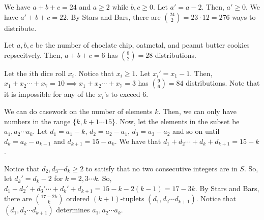 \documentclass[11pt]{article}
\begin{document}

\begin{sol}
We have $a+b+c=24$ and $a\ge 2$ while $b,c\ge 0$. Let $a'=a-2$. Then, $a'\ge 0$. We have $a'+b+c=22$. By Stars and Bars, there are $\binom{24}{2}=23\cdot 12=\boxed{276}$ ways to distribute.
\end{sol}


\begin{sol} 
Let $a,b,c$ be the number of choclate chip, oatmetal, and peanut butter cookies repsecitvely. Then, $a+b+c=6$ has $\binom{8}{2}=\boxed{28}$ distributions.
\end{sol}


\begin{sol} 
Let the $i$th dice roll $x_{i}$. Notice that $x_{i}\ge 1$. Let $x_{i}'=x_{1}-1$. Then, $x_{1}+x_{2}\cdots + x_{7}=10\implies x_{1}+x_{2}\cdots + x_{7}=3$ has $\binom{9}{6}=\boxed{84}$ distributions. Note that it is impossible for any of the $x_{i}$'s to exceed $6$.
\end{sol}


\begin{sol} 
We can do casework on the number of elements $k$. Then, we can only have numbers in the range $\{k,k+1\cdots 15\}$. Now, let the elements in the subset be $a_{1},a_{2}\cdots a_{k}$. Let $d_{1}=a_{1}-k$, $d_{2}=a_{2}-a_{1}$, $d_{3}=a_{3}-a_{2}$ and so on until $d_{k}=a_{k}-a_{k-1}$ and $d_{k+1}=15-a_{k}$. We have that $d_{1}+d_{2}\cdots + d_{k}+d_{k+1}=15-k$. 

Notice that $d_{2},d_{3}\cdots d_{k}\ge 2$ to satisfy that no two consecutive integers are in $S$. So, let $d_{k}'=d_{k}-2$ for $k=2,3\cdots k$. So, $d_{1}+d_{2}'+d_{3}'\cdots +d_{k}'+d_{k+1}=15-k-2(k-1)=17-3k$. By Stars and Bars, there are $\binom{17-2k}{k}$ ordered $(k+1)$-tuplets $(d_{1},d_{2}\cdots d_{k+1})$. Notice that $(d_{1},d_{2}\cdots d_{k+1})$ determines $a_{1},a_{2}\cdots a_{k}$.
\end{sol}
\end{document}
